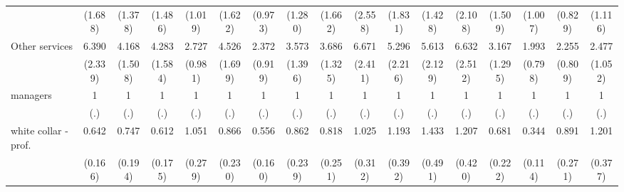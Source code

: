 {\begin{tabular}{l*{16}{c}}
                    &     (1.688)         &     (1.378)         &     (1.486)         &     (1.019)         &     (1.622)         &     (0.973)         &     (1.280)         &     (1.662)         &     (2.558)         &     (1.831)         &     (1.428)         &     (2.108)         &     (1.509)         &     (1.007)         &     (0.829)         &     (1.116)         \\
[1em]
Other services      &       6.390\sym{***}&       4.168\sym{***}&       4.283\sym{***}&       2.727\sym{**} &       4.526\sym{***}&       2.372\sym{*}  &       3.573\sym{**} &       3.686\sym{***}&       6.671\sym{***}&       5.296\sym{***}&       5.613\sym{***}&       6.632\sym{***}&       3.167\sym{**} &       1.993         &       2.255\sym{*}  &       2.477\sym{*}  \\
                    &     (2.339)         &     (1.508)         &     (1.584)         &     (0.981)         &     (1.699)         &     (0.919)         &     (1.396)         &     (1.325)         &     (2.411)         &     (2.216)         &     (2.129)         &     (2.512)         &     (1.295)         &     (0.798)         &     (0.809)         &     (1.052)         \\
[1em]
managers            &           1         &           1         &           1         &           1         &           1         &           1         &           1         &           1         &           1         &           1         &           1         &           1         &           1         &           1         &           1         &           1         \\
                    &         (.)         &         (.)         &         (.)         &         (.)         &         (.)         &         (.)         &         (.)         &         (.)         &         (.)         &         (.)         &         (.)         &         (.)         &         (.)         &         (.)         &         (.)         &         (.)         \\
[1em]
white collar - prof.&       0.642         &       0.747         &       0.612         &       1.051         &       0.866         &       0.556\sym{*}  &       0.862         &       0.818         &       1.025         &       1.193         &       1.433         &       1.207         &       0.681         &       0.344\sym{**} &       0.891         &       1.201         \\
                    &     (0.166)         &     (0.194)         &     (0.175)         &     (0.279)         &     (0.230)         &     (0.160)         &     (0.239)         &     (0.251)         &     (0.312)         &     (0.392)         &     (0.491)         &     (0.420)         &     (0.222)         &     (0.114)         &     (0.271)         &     (0.377)         \\

\end{tabular}}
